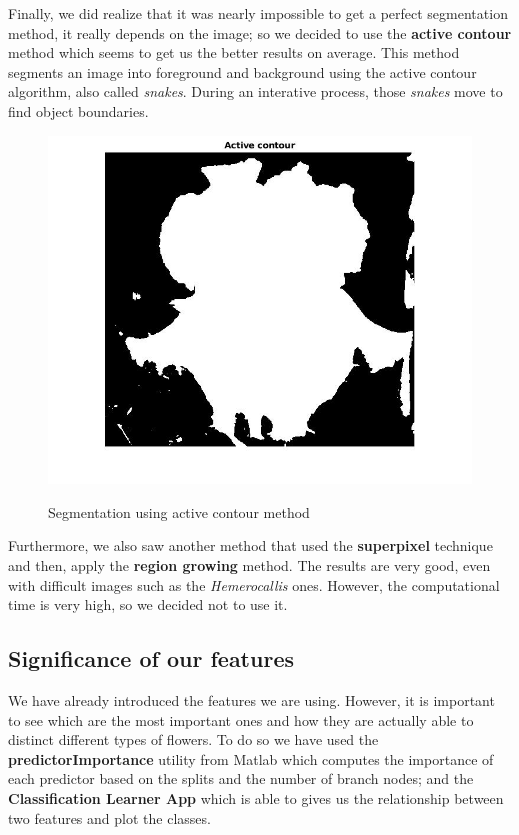 \documentclass[11]{article}
\begin{document}
Finally, we did realize that it was nearly impossible to get a perfect segmentation method, it really depends on the image; so we decided to use the \textbf{active contour} method which seems to get us the better results on average. This method segments an image into foreground and background using the active contour algorithm, also called \textit{snakes}. During an interative process, those \textit{snakes} move to find object boundaries.

\begin{figure}[H]
    \centering
  \includegraphics[scale=0.30]{images/segmentation4.jpg}
    \label{segmentation4}
    \caption{Segmentation using active contour method}
\end{figure}

Furthermore, we also saw another method\cite{segment} that used the \textbf{superpixel} technique and then, apply the \textbf{region growing} method. The results are very good, even with difficult images such as the \textit{Hemerocallis} ones. However, the computational time is very high, so we decided not to use it.

\subsection{Significance of our features}
We have already introduced the features we are using. However, it is important to see which are the most important ones and how they are actually able to distinct different types of flowers. To do so we have used the \textbf{predictorImportance} utility from Matlab which computes the importance of each predictor based on the splits and the number of branch nodes; and the \textbf{Classification Learner App} which is able to gives us the relationship between two features and plot the classes.
\end{document}
